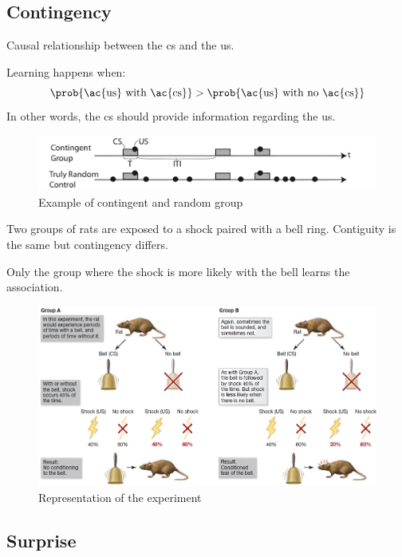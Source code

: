 \subsection{Contingency}

Causal relationship between the \acl{cs} and the \acl{us}.

\begin{remark}
    Learning happens when:
    \[ \prob{\text{\ac{us} with \ac{cs}}} > \prob{\text{\ac{us} with no \ac{cs}}} \]
    In other words, the \ac{cs} should provide information regarding the \ac{us}.
\end{remark}

\begin{figure}[H]
    \centering
    \includegraphics[width=0.6\linewidth]{./img/contingency.png}
    \caption{Example of contingent and random group}
\end{figure}

\begin{example}
    Two groups of rats are exposed to a shock paired with a bell ring.
    Contiguity is the same but contingency differs.

    Only the group where the shock is more likely with the bell learns the association.

    \begin{figure}[H]
        \centering
        \includegraphics[width=0.8\linewidth]{./img/contingency_rats.png}
        \caption{Representation of the experiment}
    \end{figure}
\end{example}


\subsection{Surprise}

